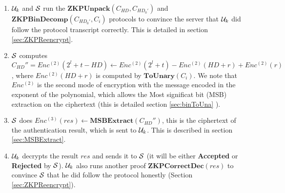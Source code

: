 \begin{description}
\begin{enumerate}
		\item $\mathcal{U}_k$ and $\mathcal{S}$ run the $\mathbf{ZKPUnpack}(C_{HD},C_{HD_0'})$ and
		$\mathbf{ZKPBinDecomp}(C_{HD_0'},C_i)$
		protocols to convince the server that
		$\mathcal{U}_k$ did follow the protocol transcript correctly. This is detailed
		in section
		\ref{sec:ZKPReencrypt}.
		\label{protocol:step6}
		\item $\mathcal{S}$ computes $C_{HD}'' = Enc^{(2)}(2^l + t - HD) \gets
		Enc^{(2)}(2^l + t) - Enc^{(2)}(HD+r) + Enc^{(2)}(r)$, where
		$Enc^{(2)}(HD + r)$ is computed by $\mathbf{ToUnary}(C_i)$. We note that
		$Enc^{(2)}$ is the second mode of encryption with the message
		encoded in the exponent of the polynomial, which allows the
		Most significat bit (MSB)
		extraction on the ciphertext (this is detailed section \ref{sec:binToUna} \label{protocol:step7}).
		\item $\mathcal{S}$ does $Enc^{(3)}(res) \gets
		\mathbf{MSBExtract}(C_{HD}'')$, this is the ciphertext
		of the authentication result, which is sent to $\mathcal{U}_k$. This
		is described in section \ref{sec:MSBExtract}.
		\label{protocol:step8}
		\item $\mathcal{U}_k$ decrypts the result $res$ and sends it to $\mathcal{S}$
		(it will be either \textbf{Accepted} or \textbf{Rejected} by $\mathcal{S}$).
		$\mathcal{U}_k$ also runs another proof $\mathbf{ZKPCorrectDec}(res)$
		to convince $\mathcal{S}$ that he
		did follow the protocol honestly (Section \ref{sec:ZKPReencrypt}).\label{protocol:step9}








\end{enumerate}
\end{description}
